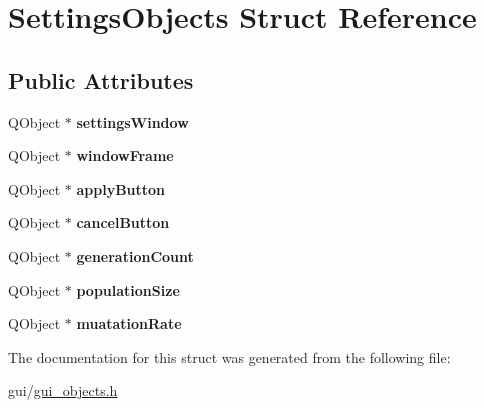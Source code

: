 \hypertarget{struct_settings_objects}{}\section{Settings\+Objects Struct Reference}
\label{struct_settings_objects}
\subsection*{Public Attributes}
\begin{DoxyCompactItemize}
\item 
\hypertarget{struct_settings_objects_a1465135bbf10a760939530207947dfb9}{}\label{struct_settings_objects_a1465135bbf10a760939530207947dfb9} 
Q\+Object $\ast$ {\bfseries settings\+Window}
\item 
\hypertarget{struct_settings_objects_ae363eaa2d19dcf059f6942671dc57ac1}{}\label{struct_settings_objects_ae363eaa2d19dcf059f6942671dc57ac1} 
Q\+Object $\ast$ {\bfseries window\+Frame}
\item 
\hypertarget{struct_settings_objects_a47e1f4fb77fbe8b9d266d72a29ae14ad}{}\label{struct_settings_objects_a47e1f4fb77fbe8b9d266d72a29ae14ad} 
Q\+Object $\ast$ {\bfseries apply\+Button}
\item 
\hypertarget{struct_settings_objects_a38e270896622f9fd547a8ecf57f18d95}{}\label{struct_settings_objects_a38e270896622f9fd547a8ecf57f18d95} 
Q\+Object $\ast$ {\bfseries cancel\+Button}
\item 
\hypertarget{struct_settings_objects_aa7f9b4ac54e2ce6ee0252e189f41e9aa}{}\label{struct_settings_objects_aa7f9b4ac54e2ce6ee0252e189f41e9aa} 
Q\+Object $\ast$ {\bfseries generation\+Count}
\item 
\hypertarget{struct_settings_objects_a077dcdc6e5bf2d1a62726459a5d74c40}{}\label{struct_settings_objects_a077dcdc6e5bf2d1a62726459a5d74c40} 
Q\+Object $\ast$ {\bfseries population\+Size}
\item 
\hypertarget{struct_settings_objects_a9e1067f96e2ee0aead5d12b8c664d7e2}{}\label{struct_settings_objects_a9e1067f96e2ee0aead5d12b8c664d7e2} 
Q\+Object $\ast$ {\bfseries muatation\+Rate}
\end{DoxyCompactItemize}


The documentation for this struct was generated from the following file\+:\begin{DoxyCompactItemize}
\item 
gui/\hyperlink{gui__objects_8h}{gui\+\_\+objects.\+h}\end{DoxyCompactItemize}
